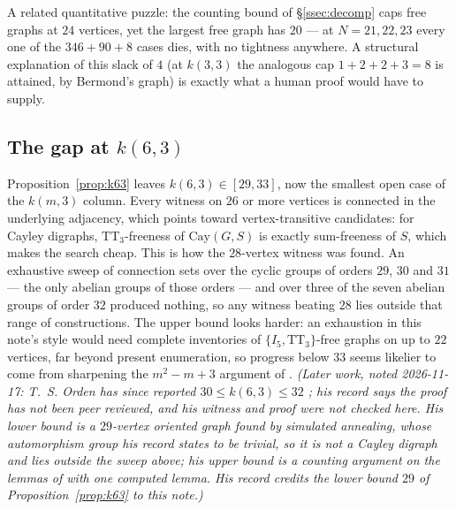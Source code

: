 \documentclass[11pt]{amsart}
\newcommand{\TT}[1]{\mathrm{TT}_{#1}}
\newcommand{\I}[1]{I_{#1}}
\theoremstyle{plain}
\theoremstyle{definition}
\theoremstyle{remark}
\begin{document}
A related quantitative puzzle: the counting bound of
\S\ref{ssec:decomp} caps free graphs at $24$ vertices, yet the largest
free graph has $20$ --- at $N=21,22,23$ every one of the $346+90+8$
cases dies, with no tightness anywhere. A structural explanation of
this slack of $4$ (at $k(3,3)$ the analogous cap $1+2+2+3=8$ is
attained, by Bermond's graph) is exactly what a human proof would have
to supply.

\subsection{The gap at $k(6,3)$}\label{ssec:qk63}
Proposition~\ref{prop:k63} leaves $k(6,3)\in[29,33]$, now the smallest
open case of the $k(m,3)$ column. Every witness on $26$ or more vertices
is connected in the underlying adjacency, which points toward
vertex-transitive candidates: for Cayley digraphs, $\TT{3}$-freeness of
$\mathrm{Cay}(G,S)$ is exactly sum-freeness of $S$, which makes the
search cheap. This is how the $28$-vertex witness was found. An
exhaustive sweep of connection sets over the cyclic groups of orders
$29$, $30$ and $31$ --- the only abelian groups of those orders --- and
over three of the seven abelian groups of order $32$ produced nothing,
so any witness beating $28$ lies outside that range of constructions. The
upper bound looks harder: an exhaustion in this note's style
would need complete inventories of $\{\I5,\TT{3}\}$-free graphs on up
to $22$ vertices, far beyond present enumeration, so progress below
$33$ seems likelier to come from sharpening the $m^2-m+3$ argument of
\cite{IRW21}. \emph{(Later work, noted 2026-11-17: T.~S. Orden has since
reported $30\le k(6,3)\le 32$ \cite{Ord26}; his record says the proof has
not been peer reviewed, and his witness and proof were not checked here. His lower bound is a
$29$-vertex oriented graph found by simulated annealing, whose
automorphism group his record states to be trivial, so it is not a Cayley
digraph and lies outside the sweep above; his upper bound is a counting
argument on the lemmas of \cite{IRW21} with one computed lemma. His
record credits the lower bound $29$ of Proposition~\ref{prop:k63} to this
note.)}
\end{document}
